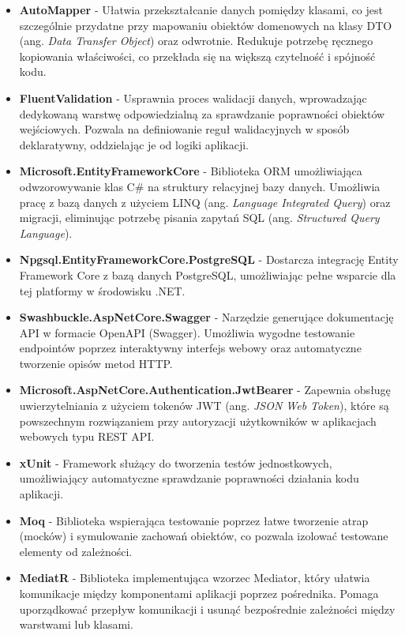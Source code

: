 \begin{itemize}
  \item \textbf{AutoMapper} - Ułatwia przekształcanie danych pomiędzy klasami, co jest szczególnie przydatne przy mapowaniu obiektów domenowych na klasy DTO (ang. \textit{Data Transfer Object}) oraz odwrotnie. Redukuje potrzebę ręcznego kopiowania właściwości, co przekłada się na większą czytelność i spójność kodu.

  \item \textbf{FluentValidation} - Usprawnia proces walidacji danych, wprowadzając dedykowaną warstwę odpowiedzialną za sprawdzanie poprawności obiektów wejściowych. Pozwala na definiowanie reguł walidacyjnych w sposób deklaratywny, oddzielając je od logiki aplikacji.

  \item \textbf{Microsoft.EntityFrameworkCore} - Biblioteka ORM umożliwiająca odwzorowywanie klas C\# na struktury relacyjnej bazy danych. Umożliwia pracę z bazą danych z użyciem LINQ (ang. \textit{Language Integrated Query}) oraz migracji, eliminując potrzebę pisania zapytań SQL (ang. \textit{Structured Query Language}).

  \item \textbf{Npgsql.EntityFrameworkCore.PostgreSQL} - Dostarcza integrację Entity Framework Core z bazą danych PostgreSQL, umożliwiając pełne wsparcie dla tej platformy w środowisku .NET.

  \item \textbf{Swashbuckle.AspNetCore.Swagger} - Narzędzie generujące dokumentację API w formacie OpenAPI (Swagger). Umożliwia wygodne testowanie endpointów poprzez interaktywny interfejs webowy oraz automatyczne tworzenie opisów metod HTTP.

  \item \textbf{Microsoft.AspNetCore.Authentication.JwtBearer} - Zapewnia obsługę uwierzytelniania z użyciem tokenów JWT (ang. \textit{JSON Web Token}), które są powszechnym rozwiązaniem przy autoryzacji użytkowników w aplikacjach webowych typu REST API.

  \item \textbf{xUnit} - Framework służący do tworzenia testów jednostkowych, umożliwiający automatyczne sprawdzanie poprawności działania kodu aplikacji.

  \item \textbf{Moq} - Biblioteka wspierająca testowanie poprzez łatwe tworzenie atrap (mocków) i symulowanie zachowań obiektów, co pozwala izolować testowane elementy od zależności.

  \item \textbf{MediatR} - Biblioteka implementująca wzorzec Mediator, który ułatwia komunikacje między komponentami aplikacji poprzez pośrednika. Pomaga uporządkować przepływ komunikacji i usunąć bezpośrednie zależności między warstwami lub klasami.

\end{itemize}


